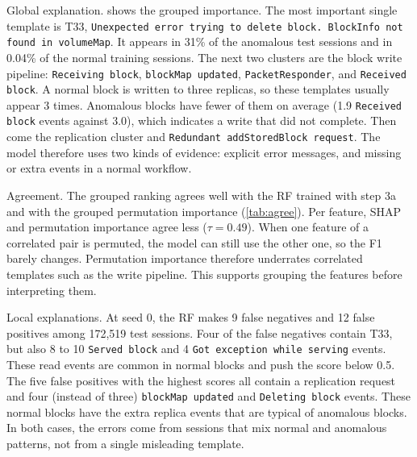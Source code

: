 \documentclass[10pt, conference]{IEEEtran}
\renewcommand{\paragraph}[1]{\noindent\textsf{#1}.}
\newcommand{\tpl}[1]{\texttt{\small #1}}
\begin{document}
\paragraph{Global explanation}  shows the grouped importance. The most important single template is T33, \tpl{Unexpected error trying to delete block. BlockInfo not found in volumeMap}. It appears in 31\% of the anomalous test sessions and in 0.04\% of the normal training sessions. The next two clusters are the block write pipeline: \tpl{Receiving block}, \tpl{blockMap updated}, \tpl{PacketResponder}, and \tpl{Received block}. A normal block is written to three replicas, so these templates usually appear 3 times. Anomalous blocks have fewer of them on average (1.9 \tpl{Received block} events against 3.0), which indicates a write that did not complete. Then come the replication cluster and \tpl{Redundant addStoredBlock request}. The model therefore uses two kinds of evidence: explicit error messages, and missing or extra events in a normal workflow.

\paragraph{Agreement} The grouped ranking agrees well with the RF trained with step 3a and with the grouped permutation importance (\cref{tab:agree}). Per feature, SHAP and permutation importance agree less ($\tau = 0.49$). When one feature of a correlated pair is permuted, the model can still use the other one, so the F1 barely changes. Permutation importance therefore underrates correlated templates such as the write pipeline. This supports grouping the features before interpreting them.

\paragraph{Local explanations} At seed 0, the RF makes 9 false negatives and 12 false positives among 172,519 test sessions. Four of the false negatives contain T33, but also 8 to 10 \tpl{Served block} and 4 \tpl{Got exception while serving} events. These read events are common in normal blocks and push the score below 0.5. The five false positives with the highest scores all contain a replication request and four (instead of three) \tpl{blockMap updated} and \tpl{Deleting block} events. These normal blocks have the extra replica events that are typical of anomalous blocks. In both cases, the errors come from sessions that mix normal and anomalous patterns, not from a single misleading template.
\end{document}
